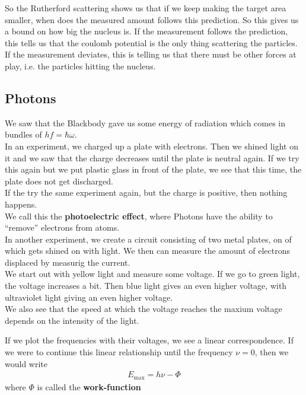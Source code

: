 So the Rutherford scattering shows us that if we keep making the target area smaller, when does the measured amount follows this prediction. So this gives us a bound on how big the nucleus is. If the measurement follows the prediction, this tells us that the coulomb potential is the only thing scattering the particles. If the measurement deviates, this is telling us that there must be other forces at play, i.e. the particles hitting the nucleus.\\


\subsection{Photons}
We saw that the Blackbody gave us some energy of radiation which comes in bundles of $hf = \hbar \omega$.\\

In an experiment, we charged up a plate with electrons. Then we shined light on it and we saw that the charge decreases until the plate is neutral again. If we try this again but we put plastic glass in front of the plate, we see that this time, the plate does not get discharged.\\

If the try the same experiment again, but the charge is positive, then nothing happens.\\

We call this the \textbf{photoelectric effect}, where Photons have the ability to ``remove'' electrons from atoms.\\

In another experiment, we create a circuit consisting of two metal plates, on of which gets shined on with light. We then can measure the amount of electrons displaced by measurig the current.\\

We start out with yellow light and measure some voltage. If we go to green light, the voltage increases a bit. Then blue light gives an even higher voltage, with ultraviolet light giving an even higher voltage.\\

We also see that the speed at which the voltage reaches the maxium voltage depends on the intensity of the light.

If we plot the frequencies with their voltages, we see a linear correspondence. If we were to continue this linear relationship until the frequency $\nu = 0$, then we would write
\begin{align*}
	E_{\max} = h \nu - \Phi
\end{align*}
where $\Phi$ is called the \textbf{work-function}\\ 

